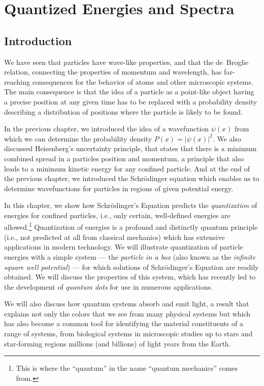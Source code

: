 \chapter[Quantized Energies and Spectra]{Quantized Energies and Spectra}
\label{chapter:quantized_energies}

\section{Introduction}
\indent We have seen that particles have wave-like
properties, and that the de~Broglie relation, connecting the
properties of momentum and wavelength, has far-reaching consequences
for the behavior of atoms and other microscopic systems. 
The main consequence is that the idea of a particle as a
point-like object having a precise position at any given time has to
be replaced with a probability density describing a distribution of
positions where the particle is likely to be found. 

In the previous chapter, we introduced the idea of a wavefunction
$\psi(x)$ from which we can determine the probability density
$P(x) = |\psi(x)|^2$. We also discussed Heisenberg's uncertainty
principle, that states that there is a minimum combined spread in 
a particles position and momentum, a principle that also leads to
a minimum kinetic energy for any confined particle.
And at the end of the previous chapter, we
introduced the Schr\"odinger equation which enables us to determine
wavefunctions for particles in regions of given potential energy.

In this chapter, we show how Schr\"odinger's Equation predicts
the {\it quantization} of energies for confined particles, i.e., only
certain, well-defined energies are allowed.\footnote{This
is where the ``quantum'' in the name ``quantum mechanics'' comes from.}
Quantization of energies is a profound and distinctly quantum principle
(i.e., not predicted at all from classical mechanics) which has extensive
applications in modern technology. We will illustrate quantization of
particle energies with a simple system --- the {\it particle in a box} (also
known as the {\it infinite square well potential}) --- for which
solutions of Schr\"odinger's Equation are readily obtained. 
We will discuss the properties of this system, which has recently
led to the development of {\it quantum dots} for use in numerous
applications.  

We will also discuss how quantum systems absorb and emit
light, a result that explains not only the colors that we see from
many physical systems but which has also become a common tool for
identifying the material constituents of a range of systems, from
biological systems in microscopic studies up to stars 
and star-forming regions
millions (and billions) of light years from the Earth.

